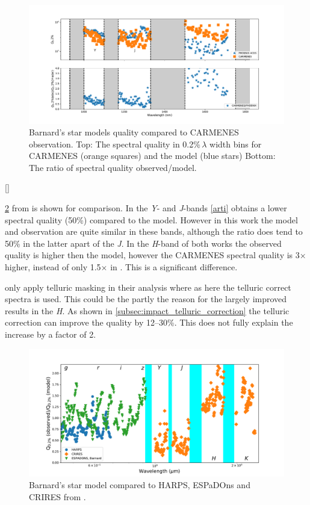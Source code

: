 \begin{figure}
    \centering
    \includegraphics[width=0.7\linewidth]{figures/information-content/Carmenes/quality_comparision_to_model}
    \caption[Barnard's star spectral quality compared to CARMENES]{Barnard's star models quality compared to CARMENES observation.
    Top: The spectral quality in 0.2\%\,\(\lambda\) width bins for CARMENES (orange squares) and the model (blue stars) Bottom: The ratio of spectral quality observed/model.}
    \label{fig:qualitycomparisiontomodel}
\end{figure}
\cref{}

\cref{fig:allw2} from \citep{artigau_optical_2018} is shown for comparison. 
In the \emph{Y}- and \emph{J}-bands \cref{arti} obtains a lower spectral quality (50\%) compared to the model. However in this work the model and observation are quite similar in these bands, although the ratio does tend to 50\% in the latter apart of the \emph{J}. In the \emph{H}-band of both works the observed quality is higher then the model, however the CARMENES spectral quality is 3\(\times\) higher, instead of only 1.5\(\times\) in \citep{artigau_optical_2018}. This is a significant difference.

\citep{artigau_optical_2018} only apply telluric masking in their analysis where as here the telluric correct spectra is used. This could be the partly the reason for the largely improved results in the \emph{H}.
As shown in \cref{subsec:impact_telluric_correction} the telluric correction can improve the quality by 12--30\%.
This does not fully explain the increase by a factor of 2.



\begin{figure}
    \centering
    \includegraphics[width=0.7\linewidth]{figures/information-content/artigau2018_figures/all_w2}
    \caption[Barnard's star Models compared to HARPS, ESPaDOns and CRIRES]{Barnard's star model compared to HARPS, ESPaDOns and CRIRES from \citep{artigau_optical_2018}.}
    \label{fig:allw2}
\end{figure}


